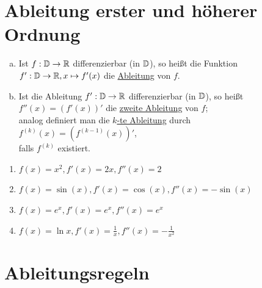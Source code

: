 \section{Ableitung erster und höherer Ordnung}
\Def
\begin{enumerate}[a)]
	\item Ist $f:\mathbb{D}\to\mathbb{R}$ differenzierbar (in $\mathbb{D}$), so heißt die Funktion $f':\mathbb{D}\to\mathbb{R}, x\mapsto f'(x)$ die \ul{Ableitung} von $f$.
	\item Ist die Ableitung $f':\mathbb{D}\to\mathbb{R}$ differenzierbar (in $\mathbb{D}$), so heißt $f''(x) = (f'(x))'$ die \ul{zweite Ableitung} von $f$;\\
	analog definiert man die \ul{$k$-te Ableitung} durch\\
	$f^{(k)}(x)=(f^{(k-1)}(x))'$,\\
	falls $f^{(k)}$ existiert.
\end{enumerate}

\Bsp
\begin{enumerate}
	\item $f(x) = x^2, f'(x)=2x, f''(x)=2$
	\item $f(x) = \sin(x), f'(x) = \cos(x), f''(x) = -\sin(x)$
	\item $f(x) = e^x, f'(x) = e^x, f''(x) = e^x$
	\item $f(x) = \ln x, f'(x) = \frac{1}{x}, f''(x) = -\frac{1}{x^2}$
\end{enumerate}

\section{Ableitungsregeln}

